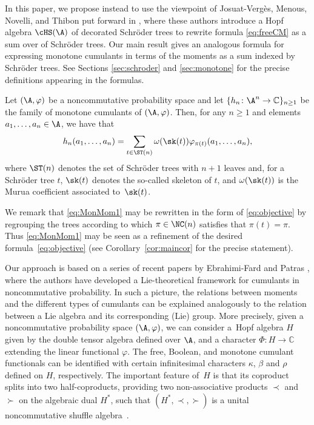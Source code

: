 In this paper, we propose instead to use the viewpoint of Josuat-Verg\`es, Menous, Novelli, and Thibon put forward in \cite{JMNT}, where these authors introduce a Hopf algebra $\cHS(\A)$ of decorated Schr\"oder trees to rewrite formula \eqref{eq:freeCM} as a sum over of Schr\"oder trees. Our main result gives an analogous formula for expressing monotone cumulants in terms of the moments as a sum indexed by Schr\"oder trees. See Sections \ref{sec:schroder} and \ref{sec:monotone} for the precise definitions appearing in the formulas.

\begin{Theorem}\label{thm:mainthm1}
Let $(\A,\varphi)$ be a noncommutative probability space and let $\{h_n\colon \A^n\to\mathbb{C}\}_{n\geq1}$ be the family of monotone cumulants of $(\A,\varphi)$. Then, for any $n\geq1$ and elements $a_1,\dots,a_n\in \A$, we have that
\begin{equation}\label{eq:MonMom1}
	h_n(a_1,\dots,a_n) =\sum_{t\in \ST(n)} \omega(\sk(t))\varphi_{\pi(t)} (a_1,\dots,a_n),
\end{equation}
where $\ST(n)$ denotes the set of Schr\"oder trees with $n+1$ leaves and, for a Schr\"oder tree $t$, $\sk(t)$ denotes the so-called skeleton of $t$, and $\omega(\sk(t))$ is the Murua coefficient associated to~$\sk(t)$.
\end{Theorem}

We remark that \eqref{eq:MonMom1} may be rewritten in the form of \eqref{eq:objective} by regrouping the trees according to which $\pi\in \NC(n)$ satisfies that $\pi(t)=\pi$. Thus \eqref{eq:MonMom1} may be seen as a refinement of the desired formula~\eqref{eq:objective} (see Corollary~\ref{cor:maincor} for the precise statement).

Our approach is based on a series of recent papers by Ebrahimi-Fard and Patras \cite{EFP1,EFP2,EFP3,EFP4,EFP5}, where the authors have developed a Lie-theoretical framework for cumulants in noncommutative probability. In such a picture, the relations between moments and the different types of cumulants can be explained analogously to the relation between a Lie algebra and its corresponding (Lie) group. More precisely, given a noncommutative probability space $(\A,\varphi)$, we can consider a~Hopf algebra $H$ given by the double tensor algebra defined over $\A$, and a character $\Phi\colon H \to \mathbb{C}$ extending the linear functional $\varphi$. The free, Boolean, and monotone cumulant functionals can be identified with certain infinitesimal characters $\kappa$, $\beta$ and $\rho$ defined on $H$, respectively. The important feature of~$H$ is that its coproduct splits into two half-coproducts, providing two non-associative products $\prec$ and $\succ$ on the algebraic dual $H^*$, such that $(H^*,\prec,\succ)$ is a unital noncommutative shuffle algebra~\cite{EFP1}.

